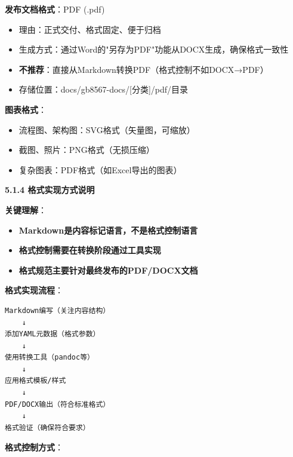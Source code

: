 \documentclass[12pt,a4paper]{article}
\numberwithin{equation}{section}  %
\begin{document}
\textbf{发布文档格式}：PDF (.pdf)
\begin{itemize}
\item 理由：正式交付、格式固定、便于归档
\item 生成方式：通过Word的"另存为PDF"功能从DOCX生成，确保格式一致性
\item \textbf{不推荐}：直接从Markdown转换PDF（格式控制不如DOCX→PDF）
\item 存储位置：{\ttfamily docs/gb8567-docs/[分类]/pdf/}目录
\end{itemize}

\textbf{图表格式}：
\begin{itemize}
\item 流程图、架构图：SVG格式（矢量图，可缩放）
\item 截图、照片：PNG格式（无损压缩）
\item 复杂图表：PDF格式（如Excel导出的图表）
\end{itemize}

\textbf{5.1.4 格式实现方式说明}

\textbf{关键理解}：
\begin{itemize}
\item [警告] \textbf{Markdown是内容标记语言，不是格式控制语言}
\item [正确] \textbf{格式控制需要在转换阶段通过工具实现}
\item [正确] \textbf{格式规范主要针对最终发布的PDF/DOCX文档}
\end{itemize}

\textbf{格式实现流程}：

\begin{verbatim}
Markdown编写（关注内容结构）
    ↓
添加YAML元数据（格式参数）
    ↓
使用转换工具（pandoc等）
    ↓
应用格式模板/样式
    ↓
PDF/DOCX输出（符合标准格式）
    ↓
格式验证（确保符合要求）
\end{verbatim}

\textbf{格式控制方式}：
\end{document}
